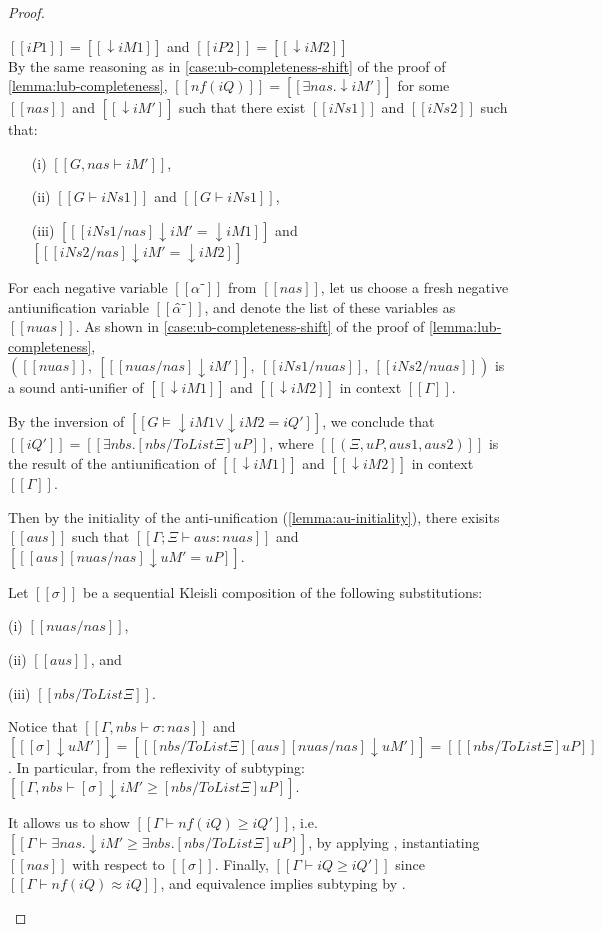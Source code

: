 \begin{proof}
\begin{caseof}
  \item $[[iP1]] = [[↓iM1]]$ and $[[iP2]] = [[↓iM2]]$\\
    By the same reasoning as in \cref{case:ub-completeness-shift} of the proof
    of \cref{lemma:lub-completeness},
    $[[nf(iQ)]] = [[ ∃nas.↓iM' ]]$
    for some $[[nas]]$ and $[[↓iM']]$ such that there exist
    $[[iNs1]]$ and $[[iNs2]]$ such that:
    \begin{enumerate}
    \item[(i)] $[[G,nas ⊢ iM']]$,
    \item[(ii)] $[[G ⊢ iNs1]]$ and $[[G ⊢ iNs1]]$,
    \item[(iii)] $[[ [iNs1/nas] ↓iM' = ↓iM1]]$ and $[[ [iNs2/nas] ↓iM' = ↓iM2]]$
    \end{enumerate}

    For each negative variable $[[α⁻]]$ from $[[nas]]$, let us choose a
    fresh negative antiunification variable $[[α̂⁻]]$, and denote the
    list of these variables as $[[nuas]]$.
    As shown in \cref{case:ub-completeness-shift} of the proof
    of \cref{lemma:lub-completeness},
    $([[nuas]],~ [[ [nuas/nas]↓iM' ]],~ [[iNs1/nuas]],~ [[iNs2/nuas]])$ is a
    sound anti-unifier of $[[↓iM1]]$ and $[[↓iM2]]$ in context $[[Γ]]$.

    By the inversion of $[[G ⊨ ↓iM1 ∨ ↓iM2 = iQ']]$,
    we conclude that $[[iQ']] = [[∃nbs.[nbs / ToList Ξ]uP]]$, where
    $[[(Ξ, uP, aus1, aus2)]]$ is the result of the antiunification
    of $[[↓iM1]]$ and $[[↓iM2]]$ in context $[[Γ]]$.


    Then by the initiality of the anti-unification
    (\cref{lemma:au-initiality}), there exisits $[[aus]]$ such that
     $[[Γ;Ξ ⊢ aus : nuas]]$ and $[[ [aus][nuas/nas]↓uM' = uP ]]$.

     Let $[[σ]]$ be a sequential Kleisli composition of the following
     substitutions:
     \begin{enumerate*}
     \item[(i)] $[[nuas/nas]]$,
     \item[(ii)] $[[aus]]$, and
     \item[(iii)] $[[nbs / ToList Ξ]]$.
     \end{enumerate*}
     Notice that $[[Γ, nbs ⊢ σ : nas]]$
     and $[[ [σ]↓uM' ]] = [[ [nbs / ToList Ξ][aus][nuas/nas]↓uM' ]] = [[ [nbs /
     ToList Ξ]uP ]]$. In particular, from the reflexivity of subtyping:
     $[[Γ, nbs ⊢ [σ]↓iM' ≥ [nbs / ToList Ξ]uP]]$.

     It allows us to show $[[Γ ⊢ nf(iQ) ≥ iQ']]$, i.e. $[[Γ ⊢ ∃nas.↓iM' ≥
     ∃nbs.[nbs / ToList Ξ]uP]]$, by applying ,
     instantiating $[[nas]]$ with respect to $[[σ]]$. Finally, $[[Γ ⊢ iQ ≥ iQ']]$
     since $[[Γ ⊢ nf(iQ) ≈ iQ]]$, and equivalence implies subtyping by .

  \end{caseof}
\end{proof}




